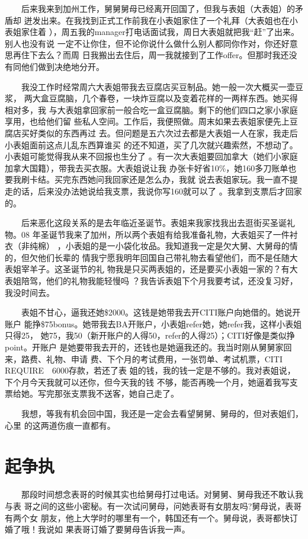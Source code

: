 \documentclass[12pt]{book}
\begin{document}
　　后来我来到加州工作，舅舅舅母已经离开回国了，但我与表姐（大表姐）的矛盾却
迸发出来。在我找到正式工作前我在小表姐家住了一个礼拜（大表姐也在小表姐家住着
），周五我的manager打电话面试我，周日大表姐就把我“赶”了出来。别人也没有说
一定不让你住，但不论你说什么做什么别人都同你作对，你还好意思再住下去么？而周
日我搬出去住后，周一我就接到了工作offer。但那时我还没有同他们做到决绝地分开。

　　我没工作时经常周六大表姐带我去豆腐店买豆制品。她一般一次大概买一壶豆浆，
两大盒豆腐脑，几个春卷，一块炸豆腐以及变着花样的一两样东西。她买得相对多，我
与大表姐拿回家前一般合吃一盒豆腐脑。剩下的他们四口之家小家庭享用，也给他们留
些私人空间。工作后，我便照做。周末如果去表姐家便先上豆腐店买好类似的东西再过
去。但问题是五六次过去都是大表姐一人在家，我走后小表姐面前这点儿乱东西算谁买
的还不知道，买了几次就兴趣索然，不想动了。小表姐可能觉得我从来不回报也生分了
。有一次大表姐要回加拿大（她们小家庭加拿大国籍），带我去买衣服。大表姐说让我
办张卡好省10\%，她160多刀账单也要我刷卡结。买完东西她问我回家还是怎么办，我就
说去表姐家玩。我一直不提走的话，后来没办法她说给我支票，我说你写160就可以了
。我拿到支票后才回家的。

　　后来恶化这段关系的是去年临近圣诞节。表姐来我家找我出去逛街买圣诞礼物。08
年圣诞节我来了加州，所以两个表姐有给我准备礼物，大表姐买了一件衬衣（非纯棉）
，小表姐的是一小袋化妆品。我知道我一定是欠大舅、大舅母的情的，但欠他们长辈的
情我宁愿我明年回国自己带礼物去看望他们，而不是任随大表姐宰羊子。这圣诞节的礼
物我是只买两表姐的，还是要买小表姐一家的？有大表姐陪驾，他们的礼物我能轻慢吗
？我告诉表姐下个月我要考试，还没复习好，我没时间去。

　　表姐不甘心，逼我还她\$2000。这钱是她带我去开CITI账户向她借的。她说开账户
能挣\$75bonus。她带我去BA开账户，小表姐refer她，她refer我，这样小表姐只得25，
她75，我50（新开账户的人得50，refer的人得25）；CITI好像是类似挣point。开账户
是她要带我去开的，还钱也是她逼我还的。我当时刚从舅舅家回来，路费、礼物、申请
费、下个月的考试费用，一张罚单、考试机票，CITI　REQUIRE　6000存款，若还了表
姐的钱，我的钱一定是不够的。我对表姐说，下个月今天我就可以还你，但今天我的钱
不够，能否再晚一个月，她逼着我写支票给她。写完那张支票我不送客，她自己走了。

　　我想，等我有机会回中国，我还是一定会去看望舅舅、舅母的，但对表姐们，心里
的这两道伤痕一直都有。
\section{起争执}
\label{sec-8-3}

　　那段时间想念表哥的时候其实也给舅母打过电话。对舅舅、舅母我还不敢认我与表
哥之间的这些小密秘。有一次试问舅母，问她表哥有女朋友吗?舅母说，表哥有两个女
朋友，他上大学时的哪里有一个，韩国还有一个。舅母说，表哥都快订婚了哦！我说如
果表哥订婚了要舅母告诉我一声。
\end{document}
